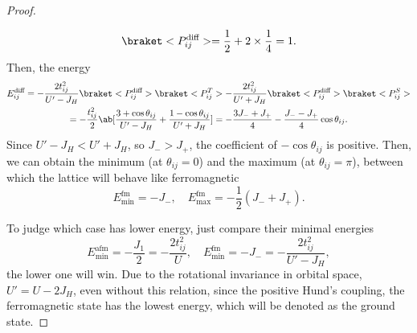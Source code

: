 \begin{solution}
\begin{enumext}[label = \Roman*.]
\begin{proof}
\begin{enumext}[label = (\alph*)]
\[          \braket<P_{ij}^\text{diff}> = \frac12 + 2 \times \frac14 = 1.
        \]
        Then, the energy
        \begin{multline*}
          E_{ij}^\text{diff} = -\frac{2t_{ij}^2}{U' - J_H}
          \braket<P_{ij}^\text{diff}> \braket<P_{ij}^T>
          - \frac{2t_{ij}^2}{U' + J_H}
          \braket<P_{ij}^\text{diff}> \braket<P_{ij}^S>\\
        = - \frac{t_{ij}^2}{2}\ab[
              \frac{3 + \cos\theta_{ij}}{U' - J_H}
            + \frac{1 - \cos\theta_{ij}}{U' + J_H}]
        = -\frac{3J_- + J_+}{4} - \frac{J_- - J_+}{4} \cos\theta_{ij}.
        \end{multline*}
        Since $U' - J_H < U' + J_H$, so $J_- > J_+$, the coefficient
        of $-\cos\theta_{ij}$ is positive. Then, we can obtain the minimum
        (at $\theta_{ij} = 0$) and the maximum (at $\theta_{ij} = \pi$),
        between which the lattice will behave like ferromagnetic
        \begin{equation}
          E_{\min}^\text{fm} = -J_-, \quad
          E_{\max}^\text{fm} = -\frac12(J_- + J_+). \tag*{
          \textuparrow \textuparrow \textuparrow \textuparrow
          \textuparrow \textuparrow \textuparrow \textuparrow
          \textuparrow \textuparrow \textuparrow \textuparrow}
        \end{equation}
      \end{enumext}
      To judge which case has lower energy, just compare their minimal energies
      \[
        E_{\min}^\text{afm} = -\frac{J_1}{2} = -\frac{2t_{ij}^2}{U},\quad
        E_{\min}^\text{fm} = -J_- = -\frac{2t_{ij}^2}{U' - J_H},
      \]
      the lower one will win. Due to the rotational invariance in
      orbital space, $U' = U - 2J_H$, even without this relation, since the
      positive Hund's coupling, the ferromagnetic state has the lowest energy,
      which will be denoted as the ground state.


\end{proof}
\end{enumext}
\end{solution}
